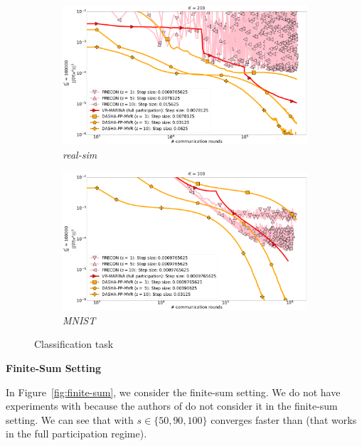 \documentclass[12pt]{article}
\begin{document}
\begin{figure}[H]
    \begin{subfigure}{.5\textwidth}
        \includegraphics[width=\textwidth]{neurips_2022_stochastic_real-sim_nof_200_numnodes_10_probs_mega_batch_100000_fix_nm_bug.pdf}
        \caption{\textit{real-sim}}
    \end{subfigure}
    \begin{subfigure}{.5\textwidth}
        \includegraphics[width=\textwidth]{neurips_2023_stochastic_mnist_nof_100_numnodes_10_probs_mega_batch_100000_batch_size_10_longer.pdf}
        \caption{\textit{MNIST}}
    \end{subfigure}
\caption{Classification task}
\label{fig:stochastic}
\end{figure}

\begin{center}
    \bf Finite-Sum Setting
\end{center}
In Figure~\ref{fig:finite-sum}, we consider the finite-sum setting. We do not have experiments with  because the authors of  do not consider it in the finite-sum setting. We can see that  with $s \in \{50, 90, 100\}$ converges faster than  (that works in the full participation regime).
\end{document}
